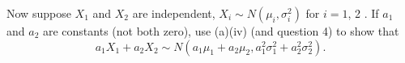 \documentclass[answers]{exam}
\begin{document}
\begin{questions}
\begin{subparts}
\subpart Now suppose $X_{1}$ and $X_{2}$ are independent, $X_{i} \sim N\left(\mu_{i}, \sigma_{i}^{2}\right)$ for $i=1$, 2 . If $a_{1}$ and $a_{2}$ are constants (not both zero), use (a)(iv) (and question 4) to show that \[
	a_{1} X_{1}+a_{2} X_{2} \sim N\left(a_{1} \mu_{1}+a_{2} \mu_{2}, a_{1}^{2} \sigma_{1}^{2}+a_{2}^{2} \sigma_{2}^{2}\right).
\]
\end{subparts}

\end{questions}
\end{document}
